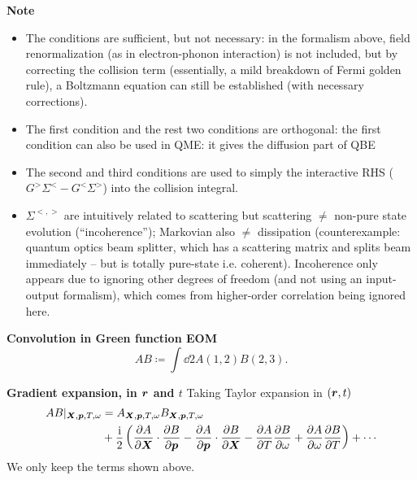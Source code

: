 \documentclass[t]{beamer}
\DeclareMathOperator{\ii}{i}
\begin{document}
\begin{frame}[allowframebreaks]
\textbf{Note} \begin{itemize}
    \item The conditions are sufficient, but not necessary: 
        in the formalism above, field renormalization
        (as in electron-phonon interaction) is not included, 
        but by correcting the collision term 
        (essentially, a mild breakdown of Fermi golden rule),
        a Boltzmann equation can still be established
        (with necessary corrections).
    \item The first condition and the rest two conditions are orthogonal:
        the first condition can also be used in QME: 
        it gives the diffusion part of QBE
    \item The second and third conditions are used to 
        simply the interactive RHS ($G^> \Sigma^< - G^< \Sigma^>$) into 
        the collision integral.
    \item $\Sigma^{<,>}$ are intuitively related to scattering but scattering $\neq$ non-pure state evolution (``incoherence''); Markovian also $\neq$ dissipation (counterexample: quantum optics beam splitter, which has a scattering matrix and splits beam immediately -- but is totally pure-state i.e. coherent).
    Incoherence only appears due to ignoring other degrees of freedom (and not using an input-output formalism), which comes from higher-order correlation being ignored here.
\end{itemize} 

\framebreak

\textbf{Convolution in Green function EOM} 
\begin{equation}
    AB \coloneqq \int \dd{2} A(1, 2) B(2, 3).
\end{equation}

\textbf{Gradient expansion, in $\vb*{r}$ and $t$} 
Taking Taylor expansion in $(\vb*{r}, t)$
\begin{equation}
    \begin{aligned}
        AB|_{\vb*{X}, \vb*{p}, T, \omega} &= A_{\vb*{X}, \vb*{p}, T, \omega} B_{\vb*{X}, \vb*{p}, T, \omega} \\
        &+ \frac{\ii}{2} \left(
            \pdv{A}{\vb*{X}} \cdot \pdv{B}{\vb*{p}}
            - \pdv{A}{\vb*{p}} \cdot \pdv{B}{\vb*{X}}
            - \pdv{A}{T} \pdv{B}{\omega}
            + \pdv{A}{\omega} \pdv{B}{T}
        \right) + \cdots
    \end{aligned}
    \label{eq:gradient-expansion-final-version}
\end{equation}
We only keep the terms shown above. 


\end{frame}
\end{document}
